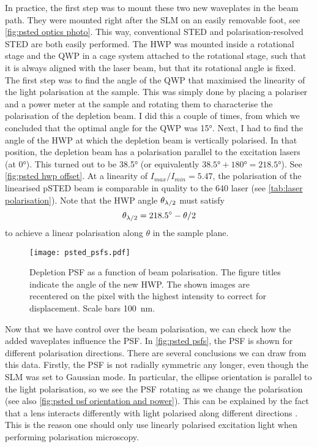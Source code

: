 In practice, the first step was to mount these two new waveplates in the beam path. They were mounted right after the SLM on an easily removable foot, see \autoref{fig:psted optics photo}. This way, conventional STED and polarisation-resolved STED are both easily performed. The HWP was mounted inside a rotational stage and the QWP in a cage system attached to the rotational stage, such that it is always aligned with the laser beam, but that its rotational angle is fixed. The first step was to find the angle of the QWP that maximised the linearity of the light polarisation at the sample. This was simply done by placing a polariser and a power meter at the sample and rotating them to characterise the polarisation of the depletion beam. I did this a couple of times, from which we concluded that the optimal angle for the QWP was \ang{15}. Next, I had to find the angle of the HWP at which the depletion beam is vertically polarised. In that position, the depletion beam has a polarisation parallel to the excitation lasers (at \ang{0}). This turned out to be \ang{38.5} (or equivalently $\ang{38.5}+\ang{180}=\ang{218.5}$). See \autoref{fig:psted hwp offset}. At a linearity of $ I_{max}/I_{min} = 5.47 $, the polarisation of the linearised pSTED beam is comparable in quality to the 640 laser (see \autoref{tab:laser polarisation}). Note that the HWP angle $ \theta_{\lambda/2} $ must satisfy
\begin{equation}
	\theta_{\lambda/2} = \ang{218.5} - \theta/2
\end{equation} 
to achieve a linear polarisation along $ \theta $ in the sample plane.

\begin{figure}
	\centering
	\texttt{[image: psted\_psfs.pdf]}
	\caption{
		Depletion PSF as a function of beam polarisation. The figure titles indicate the angle of the new HWP. The shown images are recentered on the pixel with the highest intensity to correct for displacement. Scale bars 100~nm.
	}
	\label{fig:psted psfs}
\end{figure}

Now that we have control over the beam polarisation, we can check how the added waveplates influence the PSF. In \autoref{fig:psted psfs}, the PSF is shown for different polarisation directions. There are several conclusions we can draw from this data.  Firstly, the PSF is not radially symmetric any longer, even though the SLM was set to Gaussian mode. In particular, the ellipse orientation is parallel to the light polarisation, so we see the PSF rotating as we change the polarisation (see also \autoref{fig:psted psf orientation and power}). This can be explained by the fact that a lens interacts differently with light polarised along different directions \cite{Egner2020}. This is the reason one should only use linearly polarised excitation light when performing polarisation microscopy.

